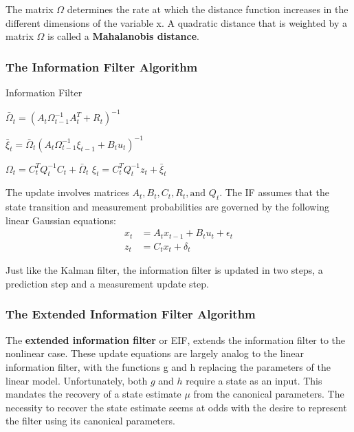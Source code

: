 \documentclass[14pt,letterpaper]{article}
\theoremstyle{definition}
\newcommand{\obs}{\bm{z}}
\newcommand{\control}{\bm{u}}
\begin{document}
The matrix $\Omega$ determines the rate at which the distance function increases in the different dimensions of the variable x.
A quadratic distance that is weighted by a matrix $\Omega$ is called a \textbf{Mahalanobis distance}.

\subsubsection{The Information Filter Algorithm}

\begin{algorithm}[H]
\caption{Information Filter}
\KwInput{$\xi_{t-1}$, $\Omega_{t-1}$, $\control_t$, $\obs_t$}

\BlankLine
{}
$\bar{\Omega}_t = (A_t \Omega_{t-1}^{-1} A_t^T + R_t)^{-1}$\;

$\bar{\xi}_t = \bar{\Omega}_t (A_t \Omega_{t-1}^{-1}\xi_{t-1} + B_t u_t)^{-1}$\;

\BlankLine
{}

$\Omega_t = C_t^T Q_t^{-1} C_t + \bar{\Omega}_t$\;
$\xi_t = C_t^T Q_t^{-1} z_t + \bar{\xi}_t $\;

\BlankLine
{}
\end{algorithm}

\vspace{2mm}

The update involves matrices $A_t, B_t, C_t, R_t, \text{and } Q_t$.
The IF assumes that the state transition and measurement probabilities are governed by the following linear Gaussian equations:
\begin{align}
  x_t &= A_t x_{t-1} + B_t u_t + \epsilon_t \\
  z_t &= C_t x_t + \delta_t
\end{align}

Just like the Kalman filter, the information filter is updated in two steps, a prediction step and a measurement update step.

\subsubsection{The Extended Information Filter Algorithm}

The \textbf{extended information filter} or EIF, extends the information filter to the nonlinear case.
These update equations are largely analog to the linear information filter, with the functions g and h replacing the parameters of the linear model.
Unfortunately, both $g$ and $h$ require a state as an input.
This mandates the recovery of a state estimate $\mu$ from the canonical parameters.
The necessity to recover the state estimate seems at odds with the desire to represent the filter using its canonical parameters.
\end{document}
